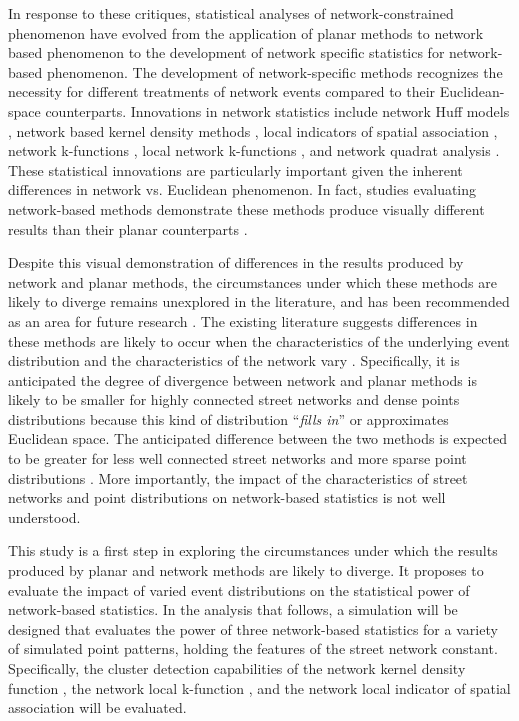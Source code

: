 \documentclass[12pt, letterpaper]{article}
\begin{document}
In response to these critiques, statistical analyses of network-constrained phenomenon have evolved from the application of planar methods to network based phenomenon \citep{black1991highway, levine1995spatial, miller1994market, okabekitamura1996,kwan1998space,blackthomas1998, okabe2001computational} to the development of network specific statistics for network-based phenomenon. The development of network-specific methods recognizes the necessity for different treatments of network events compared to their Euclidean-space counterparts. Innovations in network statistics include network Huff models \citep{miller1994market, okabekitamura1996, okabe2001computational}, network based kernel density methods  \citep{porta2009street, borruso2008network, xie2008kernel, okabe2009kernel}, local indicators of spatial association \citep{yamada2010local}, network k-functions \citep{okabeyamada2001, luchen2007false}, local network k-functions \citep{yamada2007local}, and network quadrat analysis \citep{shiode2008analysis}. These statistical innovations are particularly important given the inherent differences in network vs. Euclidean phenomenon. In fact, studies evaluating network-based methods demonstrate these methods produce visually different results than their planar counterparts \citep{yamada2004comparison, cheng2005experimental, downs2007characterising}. 

Despite this visual demonstration of differences in the results produced by network and planar methods, the circumstances under which these methods are likely to diverge remains unexplored in the literature, and has been recommended as an area for future research \citep{luchen2007false, borruso2008network}. The existing literature suggests differences in these methods are likely to occur when the characteristics of the underlying event distribution and the characteristics of the network vary \citep{yamada2004comparison}. Specifically, it is anticipated the degree of divergence between network and planar methods is likely to be smaller for highly connected street networks and dense points distributions \citep{luchen2007false}because this kind of distribution ``\emph{fills in}'' or approximates Euclidean space. The anticipated difference between the two methods is expected to be greater for less well connected street networks and more sparse point distributions  \citep{luchen2007false}. More importantly, the impact of the characteristics of street networks and point distributions on network-based statistics is not well understood.

This study is a first step in exploring the circumstances under which the results produced by planar and network methods are likely to diverge. It proposes to evaluate the impact of varied event distributions on the statistical power of network-based statistics. In the analysis that follows, a simulation will be designed that evaluates the power of three network-based statistics for a variety of simulated point patterns, holding the features of the street network constant. Specifically, the cluster detection capabilities of the network kernel density function \citep{okabe2009kernel}, the network local k-function \citep{yamada2007local}, and the network local indicator of spatial association \citep{yamada2010local} will be evaluated. 
\end{document}
